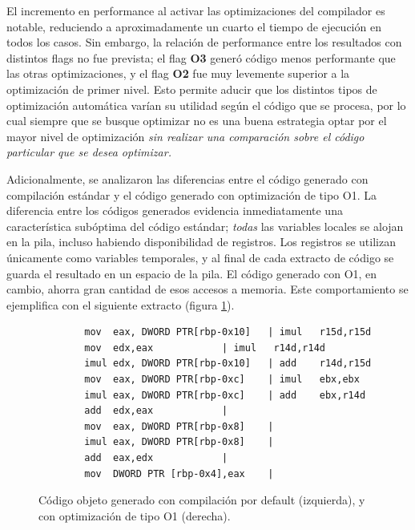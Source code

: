 El incremento en performance al activar las optimizaciones del compilador es notable, reduciendo a aproximadamente un cuarto el tiempo de ejecución en todos los casos. Sin embargo, la relación de performance entre los resultados con distintos flags no fue prevista; el flag \textbf{O3} generó código menos performante que las otras optimizaciones, y el flag \textbf{O2} fue muy levemente superior a la optimización de primer nivel. Esto permite aducir que los distintos tipos de optimización automática varían su utilidad según el código que se procesa, por lo cual siempre que se busque optimizar no es una buena estrategia optar por el mayor nivel de optimización \emph{sin realizar una comparación sobre el código particular que se desea optimizar.}

Adicionalmente, se analizaron las diferencias entre el código generado con compilación estándar y el código generado con optimización de tipo O1. La diferencia entre los códigos generados evidencia inmediatamente una característica subóptima del código estándar; \emph{todas} las variables locales se alojan en la pila, incluso habiendo disponibilidad de registros. Los registros se utilizan únicamente como variables temporales, y al final de cada extracto de código se guarda el resultado en un espacio de la pila. El código generado con O1, en cambio, ahorra gran cantidad de esos accesos a memoria. Este comportamiento se ejemplifica con el siguiente extracto (figura \ref{fig:codigo-objeto-filtro-color}).

\begin{figure}[h]
	\begin{mdframed}
	\begin{center}
		\begin{lstlisting}
		mov  eax, DWORD PTR[rbp-0x10]	| imul   r15d,r15d
		mov  edx,eax			| imul   r14d,r14d
		imul edx, DWORD PTR[rbp-0x10]	| add    r14d,r15d
		mov  eax, DWORD PTR[rbp-0xc]	| imul   ebx,ebx
		imul eax, DWORD PTR[rbp-0xc]	| add    ebx,r14d
		add  edx,eax			|			
		mov  eax, DWORD PTR[rbp-0x8]	|			
		imul eax, DWORD PTR[rbp-0x8]	|			
		add  eax,edx			|			
		mov  DWORD PTR [rbp-0x4],eax	|			
		\end{lstlisting}
	\end{center}
	\end{mdframed}
	\caption{Código objeto generado con compilación por default (izquierda), y con optimización de tipo O1 (derecha).}
	\label{fig:codigo-objeto-filtro-color}
\end{figure}

